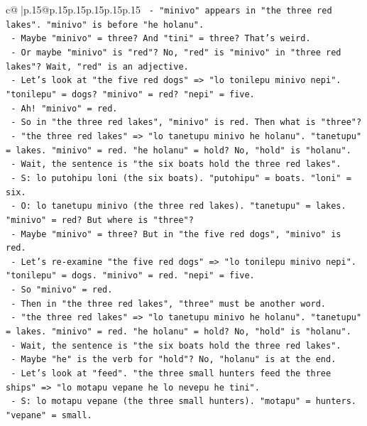\documentclass{article}
\begin{document}
{\begin{supertabular}{c@{$\;$}|p{.15\linewidth}@{}p{.15\linewidth}p{.15\linewidth}p{.15\linewidth}p{.15\linewidth}p{.15\linewidth}}
{{{\texttt{       {-} "minivo" appears in "the three red lakes". "minivo" is before "he holanu".} \\
\texttt{       {-} Maybe "minivo" = three? And "tini" = three? That's weird.} \\
\texttt{       {-} Or maybe "minivo" is "red"? No, "red" is "minivo" in "three red lakes"? Wait, "red" is an adjective.} \\
\texttt{       {-} Let's look at "the five red dogs" => "lo tonilepu minivo nepi". "tonilepu" = dogs? "minivo" = red? "nepi" = five.} \\
\texttt{       {-} Ah! "minivo" = red.} \\
\texttt{       {-} So in "the three red lakes", "minivo" is red. Then what is "three"?} \\
\texttt{       {-} "the three red lakes" => "lo tanetupu minivo he holanu". "tanetupu" = lakes. "minivo" = red. "he holanu" = hold? No, "hold" is "holanu".} \\
\texttt{       {-} Wait, the sentence is "the six boats hold the three red lakes".} \\
\texttt{       {-} S: lo putohipu loni (the six boats). "putohipu" = boats. "loni" = six.} \\
\texttt{       {-} O: lo tanetupu minivo (the three red lakes). "tanetupu" = lakes. "minivo" = red? But where is "three"?} \\
\texttt{       {-} Maybe "minivo" = three? But in "the five red dogs", "minivo" is red.} \\
\texttt{       {-} Let's re{-}examine "the five red dogs" => "lo tonilepu minivo nepi". "tonilepu" = dogs. "minivo" = red. "nepi" = five.} \\
\texttt{       {-} So "minivo" = red.} \\
\texttt{       {-} Then in "the three red lakes", "three" must be another word.} \\
\texttt{       {-} "the three red lakes" => "lo tanetupu minivo he holanu". "tanetupu" = lakes. "minivo" = red. "he holanu" = hold? No, "hold" is "holanu".} \\
\texttt{       {-} Wait, the sentence is "the six boats hold the three red lakes".} \\
\texttt{       {-} Maybe "he" is the verb for "hold"? No, "holanu" is at the end.} \\
\texttt{       {-} Let's look at "feed". "the three small hunters feed the three ships" => "lo motapu vepane he lo nevepu he tini".} \\
\texttt{       {-} S: lo motapu vepane (the three small hunters). "motapu" = hunters. "vepane" = small.} \\
}}}
\end{supertabular}}
\end{document}
